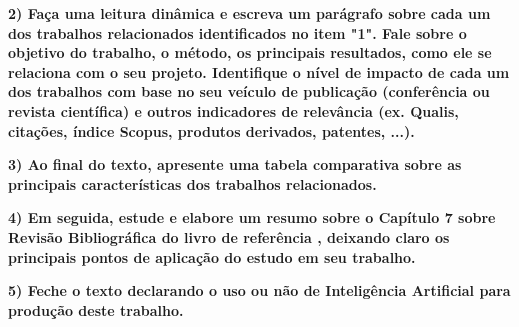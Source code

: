 \documentclass[
	12pt,				%
	openright,			%
	oneside,			%
	a4paper,			%
	chapter=TITLE,		%
	subsection=TITLE,	%
	english,			%
	brazil,				%
	]{abntex2}
\begin{document}
\textbf{2) Faça uma leitura dinâmica e escreva um parágrafo sobre cada um dos trabalhos relacionados identificados no item "1". Fale sobre o objetivo do trabalho, o método, os principais resultados, como ele se relaciona com o seu projeto.  Identifique o nível de impacto de cada um dos trabalhos com base no seu veículo de publicação (conferência ou revista científica) e outros indicadores de relevância (ex. Qualis, citações,  índice Scopus, produtos derivados, patentes, ...).}

\textbf{3) Ao final do texto, apresente uma tabela comparativa sobre as principais características dos trabalhos relacionados.}

\textbf{4) Em seguida, estude e elabore um resumo sobre o Capítulo 7 sobre Revisão Bibliográfica do livro de referência \cite{metodologiaWazlawick}, deixando claro os principais pontos de aplicação do estudo em seu trabalho.}

\textbf{5) Feche o texto declarando o uso ou não de Inteligência Artificial para produção deste trabalho.}
\end{document}
